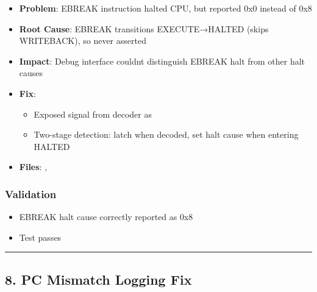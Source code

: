 \begin{record}

\begin{itemize}
\tightlist
\item
  \textbf{Problem}: EBREAK instruction halted CPU, but 
  reported 0x0 instead of 0x8
\item
  \textbf{Root Cause}: EBREAK transitions EXECUTE→HALTED (skips
  WRITEBACK), so  never asserted
\item
  \textbf{Impact}: Debug interface couldn\textquotesingle t distinguish
  EBREAK halt from other halt causes
\item
  \textbf{Fix}:

  \begin{itemize}
  \tightlist
  \item
    Exposed  signal from decoder as 
  \item
    Two-stage detection: latch when decoded, set halt cause when
    entering HALTED
  \end{itemize}
\item
  \textbf{Files}: , 
\end{itemize}

\end{record}

\subsubsection{Validation}\label{cr:fix:fixes-index:validation-2}

\begin{record}

\begin{itemize}
\tightlist
\item
  \ok{} EBREAK halt cause correctly reported as 0x8
\item
  \ok{} Test  passes
\end{itemize}

\begin{center}\rule{0.5\linewidth}{0.5pt}\end{center}

\end{record}

\subsection{8. PC Mismatch Logging Fix}\label{cr:fix:fixes-index:8-pc-mismatch-logging-fix}

